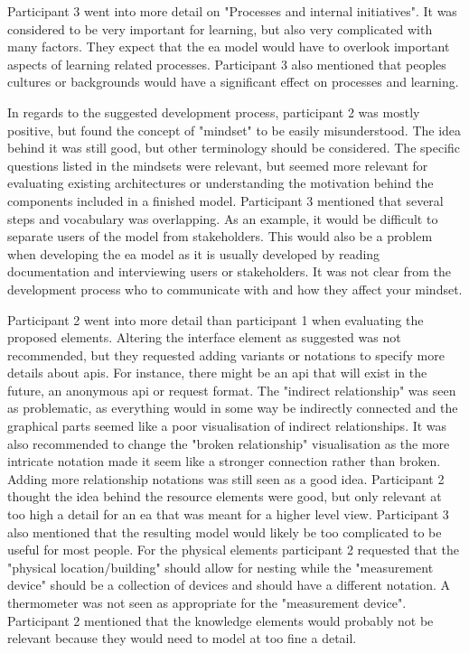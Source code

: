 Participant 3 went into more detail on "Processes and internal initiatives". It was considered to be very important for learning, but also very complicated with many factors. They expect that the \gls{ea} model would have to overlook important aspects of learning related processes. Participant 3 also mentioned that peoples cultures or backgrounds would have a significant effect on processes and learning.

In regards to the suggested development process, participant 2 was mostly positive, but found the concept of "mindset" to be easily misunderstood. The idea behind it was still good, but other terminology should be considered. The specific questions listed in the mindsets were relevant, but seemed more relevant for evaluating existing architectures or understanding the motivation behind the components included in a finished model. Participant 3 mentioned that several steps and vocabulary was overlapping. As an example, it would be difficult to separate users of the model from stakeholders. This would also be a problem when developing the \gls{ea} model as it is usually developed by reading documentation and interviewing users or stakeholders. It was not clear from the development process who to communicate with and how they affect your mindset.

Participant 2 went into more detail than participant 1 when evaluating the proposed elements. Altering the interface element as suggested was not recommended, but they requested adding variants or notations to specify more details about \glspl{api}. For instance, there might be an \gls{api} that will exist in the future, an anonymous \gls{api} or request format. The "indirect relationship" was seen as problematic, as everything would in some way be indirectly connected and the graphical parts seemed like a poor visualisation of indirect relationships. It was also recommended to change the "broken relationship" visualisation as the more intricate notation made it seem like a stronger connection rather than broken. Adding more relationship notations was still seen as a good idea. Participant 2 thought the idea behind the resource elements were good, but only relevant at too high a detail for an \gls{ea} that was meant for a higher level view. Participant 3 also mentioned that the resulting model would likely be too complicated to be useful for most people. For the physical elements participant 2 requested that the "physical location/building" should allow for nesting while the "measurement device" should be a collection of devices and should have a different notation. A thermometer was not seen as appropriate for the "measurement device". Participant 2 mentioned that the knowledge elements would probably not be relevant because they would need to model at too fine a detail.